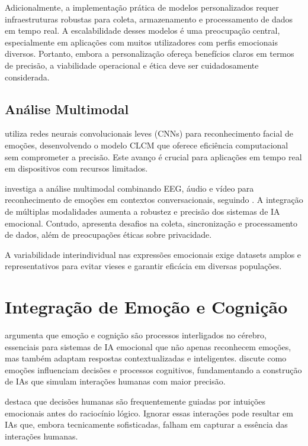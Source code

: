 \documentclass[a4paper,12pt]{report}
\begin{document}
	Adicionalmente, a implementação prática de modelos personalizados requer infraestruturas robustas para coleta, armazenamento e processamento de dados em tempo real. A escalabilidade desses modelos é uma preocupação central, especialmente em aplicações com muitos utilizadores com perfis emocionais diversos. Portanto, embora a personalização ofereça benefícios claros em termos de precisão, a viabilidade operacional e ética deve ser cuidadosamente considerada.
	
	
	
	
	\subsection{Análise Multimodal}
	
	\textcite{gursesli2024} utiliza redes neurais convolucionais leves (CNNs) para reconhecimento facial de emoções, desenvolvendo o modelo CLCM que oferece eficiência computacional sem comprometer a precisão. Este avanço é crucial para aplicações em tempo real em dispositivos com recursos limitados.
	
	\textcite{lee2024} investiga a análise multimodal combinando EEG, áudio e vídeo para reconhecimento de emoções em contextos conversacionais, seguindo \textcite{poria2015}. A integração de múltiplas modalidades aumenta a robustez e precisão dos sistemas de IA emocional. Contudo, apresenta desafios na coleta, sincronização e processamento de dados, além de preocupações éticas sobre privacidade.
	
	A variabilidade interindividual nas expressões emocionais exige datasets amplos e representativos para evitar vieses e garantir eficácia em diversas populações.
	
	
	
	
	\section{Integração de Emoção e Cognição}
	
	\textcite{pessoa2013} argumenta que emoção e cognição são processos interligados no cérebro, essenciais para sistemas de IA emocional que não apenas reconhecem emoções, mas também adaptam respostas contextualizadas e inteligentes. \textcite{pessoa2013} discute como emoções influenciam decisões e processos cognitivos, fundamentando a construção de IAs que simulam interações humanas com maior precisão.
	
	\textcite{haidt2001} destaca que decisões humanas são frequentemente guiadas por intuições emocionais antes do raciocínio lógico. Ignorar essas interações pode resultar em IAs que, embora tecnicamente sofisticadas, falham em capturar a essência das interações humanas.
	
\end{document}
